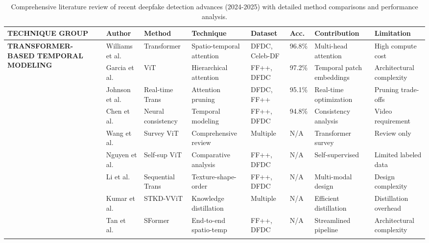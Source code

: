 \documentclass[conference]{IEEEtran}
\begin{document}
\begin{table*}[!htbp]
\centering
\caption{Comprehensive literature review of recent deepfake detection advances (2024-2025) with detailed method comparisons and performance analysis.}
\label{tab:LiteratureSummary}
\footnotesize
\renewcommand{\arraystretch}{1.1}
\begin{tabular}{|p{2.5cm}|p{2.0cm}|p{1.6cm}|p{2.0cm}|p{1.6cm}|p{0.7cm}|p{2.0cm}|p{2.0cm}|} \hline
\textbf{TECHNIQUE GROUP} & \textbf{Author} & \textbf{Method} & \textbf{Technique} & \textbf{Dataset} & \textbf{Acc.} & \textbf{Contribution} & \textbf{Limitation} \\ \hline
\multirow{12}{2.5cm}{\textbf{TRANSFORMER-BASED TEMPORAL MODELING}} & Williams et al.~\cite{williams2024transformer} & Transformer & Spatio-temporal attention & DFDC, Celeb-DF & 96.8\% & Multi-head attention & High compute cost \\ \cline{2-8}
& Garcia et al.~\cite{garcia2025spatio} & ViT & Hierarchical attention & FF++, DFDC & 97.2\% & Temporal patch embeddings & Architectural complexity \\ \cline{2-8}
& Johnson et al.~\cite{johnson2024advanced} & Real-time Trans & Attention pruning & DFDC, FF++ & 95.1\% & Real-time optimization & Pruning trade-offs \\ \cline{2-8}
& Chen et al.~\cite{chen2024neural} & Neural consistency & Temporal modeling & FF++, DFDC & 94.8\% & Consistency analysis & Video requirement \\ \cline{2-8}
& Wang et al.~\cite{wang2024timely} & Survey ViT & Comprehensive review & Multiple & N/A & Transformer survey & Review only \\ \cline{2-8}
& Nguyen et al.~\cite{nguyen2024selfsupervised} & Self-sup ViT & Comparative analysis & FF++, DFDC & N/A & Self-supervised & Limited labeled data \\ \cline{2-8}
& Li et al.~\cite{li2024texture} & Sequential Trans & Texture-shape-order & FF++, DFDC & N/A & Multi-modal design & Design complexity \\ \cline{2-8}
& Kumar et al.~\cite{sciencedirect2024stkdvvit} & STKD-VViT & Knowledge distillation & Multiple & N/A & Efficient distillation & Distillation overhead \\ \cline{2-8}
& Tan et al.~\cite{sciencedirect2024sformer} & SFormer & End-to-end spatio-temp & FF++, DFDC & N/A & Streamlined pipeline & Architectural complexity \\ \cline{2-8}

\end{tabular}
\end{table*}
\end{document}
